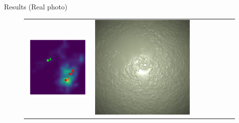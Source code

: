 \documentclass[final]{beamer}
\newlength{\twocolwid}
\newlength{\resultwidth}
\begin{document}
\begin{frame}[t]
\begin{columns}[t]
\begin{column}{\twocolwid}
\begin{block}{Results (Real photo)}
\begin{figure}[t]
\begin{tabular}{ccrclccc}
            		\includegraphics[width=\resultwidth]{images/real/plaster/posterior.pdf} &
            		\includegraphics[width=\resultwidth]{images/real/plaster/good1.jpg} &

\end{tabular}
\end{figure}
\end{block}
\end{column}
\end{columns}
\end{frame}
\end{document}
